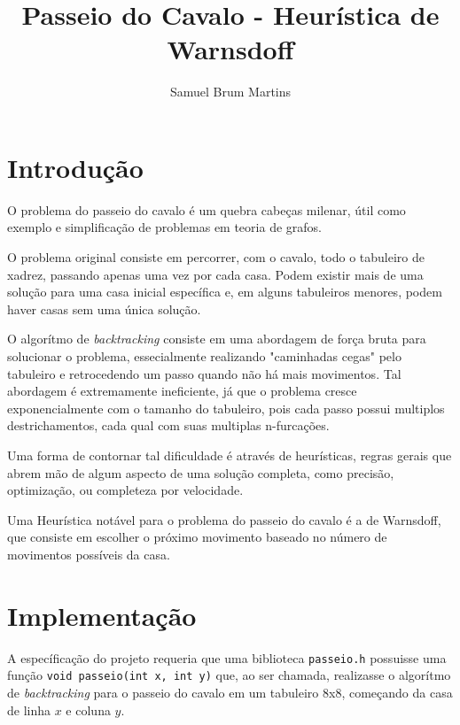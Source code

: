 \documentclass[
	twocolumn,
	12pt,				%
	twoside,			%
	a4paper,			%
	english,			%
	brazil				%
	]{article}
\title{Passeio do Cavalo - Heurística de Warnsdoff}
\author{Samuel Brum Martins}
\date{}
\begin{document}

\frenchspacing 

{\let\newpage\relax\maketitle}
\thispagestyle{fancy}

\section*{Introdução}
O problema do passeio do cavalo é um quebra cabeças milenar,
útil como exemplo e simplificação de problemas em teoria de grafos.

O problema original consiste em percorrer, com o cavalo,
todo o tabuleiro de xadrez, passando apenas uma vez por cada casa.
Podem existir mais de uma solução para uma casa inicial específica e,
em alguns tabuleiros menores, podem haver casas sem uma única solução.

O algorítmo de \textit{backtracking} consiste em uma abordagem de força bruta
para solucionar o problema, essecialmente realizando "caminhadas cegas"
pelo tabuleiro e retrocedendo um passo quando não há mais movimentos.
Tal abordagem é extremamente ineficiente, já que o problema cresce
exponencialmente com o tamanho do tabuleiro, pois cada passo possui
multiplos destrichamentos, cada qual com suas multiplas n-furcações.

Uma forma de contornar tal dificuldade é através de heurísticas,
regras gerais que abrem mão de algum aspecto de uma solução completa,
como precisão, optimização, ou completeza por velocidade. 

Uma Heurística notável para o problema do passeio do cavalo é a de Warnsdoff, que consiste
em escolher o próximo movimento baseado no número de movimentos possíveis
da casa.

\section*{Implementação}
A específicação do projeto requeria que uma biblioteca \verb|passeio.h| possuisse
uma função \verb|void passeio(int x, int y)| que, ao ser chamada, realizasse
o algorítmo de \textit{backtracking} para o passeio do cavalo em um 
tabuleiro 8x8, começando da casa de linha $x$ e coluna $y$.
\end{document}
